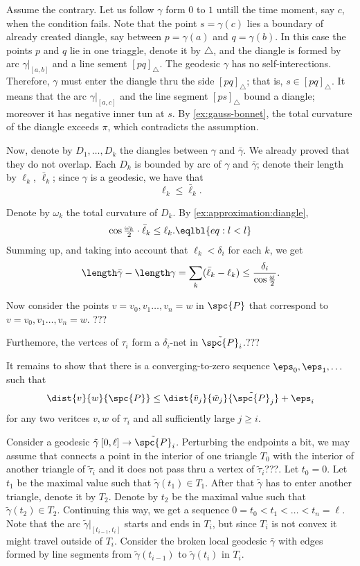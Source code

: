 Assume the contrary.
Let us follow $\gamma$ form $0$ to $1$ untill the time moment, say $c$, when the condition fails.
Note that the point $s=\gamma(c)$ lies a boundary of already created diangle, say between $p=\gamma(a)$ and $q=\gamma(b)$.
In this case the points $p$ and $q$ lie in one triaggle, denote it by $\triangle$, and the diangle is formed by arc $\gamma|_{[a,b]}$ and a line sement $[pq]_\triangle$.
The geodesic $\gamma$ has no self-interections.
Therefore, $\gamma$ must enter the diangle thru the side $[pq]_\triangle$;
that is, $s\in [pq]_\triangle$.
It means that the arc $\gamma|_{[a,c]}$ and the line segment $[ps]_\triangle$ bound a diangle;
moreover it has negative inner tun at $s$.
By \ref{ex:gauss-bonnet}, the total curvature of the diangle exceeds $\pi$, which contradicts the assumption.

Now, denote by $D_1,\dots, D_k$ the diangles between $\gamma$ and $\bar\gamma$.
We already proved that they do not overlap.
Each $D_k$ is bounded by arc of $\gamma$ and $\bar\gamma$;
denote their length by $\ell_k$, $\bar \ell_k$;
since $\gamma$ is a geodesic, we have that
\[\ell_k\le \bar\ell_k.\]

Denote by $\omega_k$ the total curvature of $D_k$.
By \ref{ex:approximation:diangle},
\[\cos\tfrac{\omega_k}2\cdot\bar\ell_k\le \ell_k.
\eqlbl{eq:l<l}\]
Summing up, and taking into account that $\ell_k<\delta_i$ for each $k$, we get
\[\length\bar\gamma-\length\gamma=\sum_k(\bar\ell_k-\ell_k)\le \frac{\delta_i}{\cos\tfrac{\omega}2}.\]

Now consider the points $v=v_0,v_1\dots,v_n=w$ in $\spc{P}$ that correspond to $v=v_0,v_1\dots,v_n=w$.
???
\qeds



Furthemore, the vertces of $\tau_i$ form a $\delta_i$-net in $\tilde{\spc{P}}_i$.???

It remains to show that there is a  converging-to-zero sequence $\eps_0,\eps_1,\dots$ such that
\[\dist{v}{w}{\spc{P}}\le \dist{\tilde v_j}{\tilde w_j}{\tilde{\spc{P}}_j}+\eps_i\]
for any two veritces $v,w$ of $\tau _i$ and all sufficiently large $j\ge i$.



Consider a geodesic $\tilde\gamma\:[0,\ell]\to\tilde{\spc{P}}_i$.
Perturbing the endpoints a bit, we may assume that connects a point in the interior of one triangle $T_0$ with the interior of another triangle of $\tilde\tau_i$ and it does not pass thru a vertex of $\tilde\tau_i$???.
Let $t_0=0$.
Let $t_1$ be the maximal value such that $\tilde\gamma(t_1) \in T_1$.
After that $\tilde\gamma$ has to enter another triangle, denote it by $T_2$.
Denote by $t_2$ be the maximal value such that $\tilde\gamma(t_2) \in T_2$.
Continuing this way, we get a sequence $0=t_0<t_1<\dots<t_n=\ell$.
Note that the arc $\tilde\gamma|_{[t_{i-1},t_i]}$ starts and ends in $T_i$, but since $T_i$ is not convex it might travel outside of $T_i$.
Consider the broken local geodesic $\bar\gamma$ with edges formed by line segments from $\tilde\gamma(t_{i-1})$ to $\tilde\gamma(t_i)$ in $T_i$.

